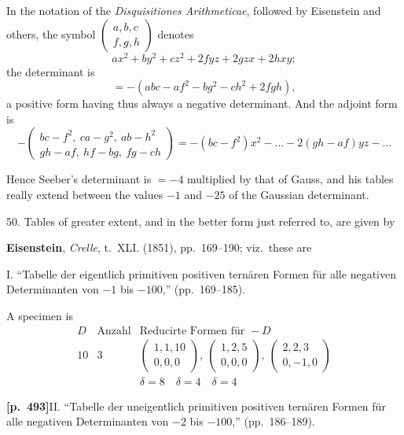 \documentclass[11pt,a4paper]{article}
\begin{document}
In the notation of the \textit{Disquisitiones Arithmeticae}, followed by Eisenstein and others, the symbol $\left(\begin{array}{ccc}a, b, c \\ f, g, h\end{array}\right)$ denotes
\[
ax^{2} + by^{2} + cz^{2} + 2fyz + 2gzx + 2hxy;
\]
the determinant is
\[
= -(abc - af^{2} - bg^{2} - ch^{2} + 2fgh),
\]
a positive form having thus always a negative determinant. And the adjoint form is
\[
-\left(\begin{array}{c}bc - f^{2},\ ca - g^{2},\ ab - h^{2} \\ gh - af,\ hf - bg,\ fg - ch\end{array}\right) = -(bc - f^{2})x^{2} - \ldots - 2(gh - af)yz - \ldots
\]

Hence Seeber's determinant is $= -4$ multiplied by that of Gauss, and his tables really extend between the values $-1$ and $-25$ of the Gaussian determinant.

50. Tables of greater extent, and in the better form just referred to, are given by

\textbf{Eisenstein}, \textit{Crelle}, t.~XLI. (1851), pp.~169--190; viz.\ these are

I. ``Tabelle der eigentlich primitiven positiven tern\"aren Formen f\"ur alle negativen Determinanten von $-1$ bis $-100$,'' (pp.~169--185).

A specimen is
\[
\begin{array}{c|c|l}
D & \text{Anzahl} & \text{Reducirte Formen f\"ur }-D \\
\hline
10 & 3 & \left(\begin{array}{c}1, 1, 10 \\ 0, 0, 0\end{array}\right),\ \left(\begin{array}{c}1, 2, 5 \\ 0, 0, 0\end{array}\right),\ \left(\begin{array}{c}2, 2, 3 \\ 0, -1, 0\end{array}\right) \\
 & & \delta = 8\quad \delta = 4\quad \delta = 4
\end{array}
\]

\noindent\textbf{[p.~493]}\quad II. ``Tabelle der uneigentlich primitiven positiven tern\"aren Formen f\"ur alle negativen Determinanten von $-2$ bis $-100$,'' (pp.~186--189).
\end{document}
